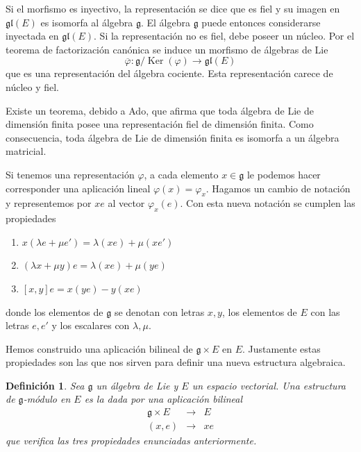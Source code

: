 \documentclass[a4paper,draft,12pt]{scrartcl}
\newtheorem{defi}{Definición}[section]%
\newcommand{\g}{\mathfrak{g}}%
\newcommand{\lto}{\longrightarrow}%
\newcommand{\df}[1]{\textsf{\color{blue}#1}}
\DeclareMathOperator{\Ker}{Ker}%
\begin{document}
Si el morfismo es inyectivo, la representación se dice que es  \df{fiel}  y su imagen en $\mathfrak{gl}(E)$ es isomorfa al álgebra $\g$.  El álgebra $\g$ puede entonces considerarse inyectada en $\mathfrak{gl}(E)$.
Si la representación no es fiel, debe poseer un núcleo.  Por el teorema de factorización canónica se induce un morfismo de álgebras de Lie
$$
\overline{\varphi} :\g/\Ker(\varphi) \lto \mathfrak{gl}(E)
$$
que es una representación del álgebra cociente.  Esta representación carece de núcleo y fiel.

\bigskip


Existe un teorema, debido a Ado, que afirma que toda álgebra de Lie de dimensión finita posee una representación fiel de dimensión finita.  Como consecuencia, toda álgebra de Lie de dimensión finita es isomorfa a un álgebra matricial.

\bigskip

Si tenemos una representación $\varphi$, a cada elemento $x \in \g$ le podemos hacer corresponder una aplicación lineal $\varphi(x)= \varphi_x$.  Hagamos un cambio de notación y representemos por $xe$ al vector $\varphi_x(e)$.  Con esta nueva notación se cumplen las propiedades

\begin{enumerate}[\indent 1.- ]

\item $x (\lambda e+ \mu e')= \lambda(xe)+ \mu (xe')$

\item $(\lambda x+ \mu y)e = \lambda(xe) + \mu(ye)$

\item $[x,y]e= x(ye)-y(xe)$

\end{enumerate}
donde los elementos de $\g$ se denotan con letras $x,y$, los elementos de $E$ con las letras $e,e'$ y los escalares con $\lambda, \mu$.

Hemos construido una aplicación bilineal de $\g \times E$ en $E$.  Justamente estas propiedades son las que nos sirven para definir una nueva estructura algebraica.

\begin{defi}

Sea $\g$ un álgebra de Lie y $E$ un espacio vectorial.  Una estructura de $\g$-módulo en $E$ es la dada por una aplicación bilineal
$$
\begin{array}{ccl}
\g \times E & \lto& E \\
(x,e)& \lto & xe
\end{array}
$$
que verifica las tres propiedades enunciadas anteriormente.

\end{defi}
\end{document}
